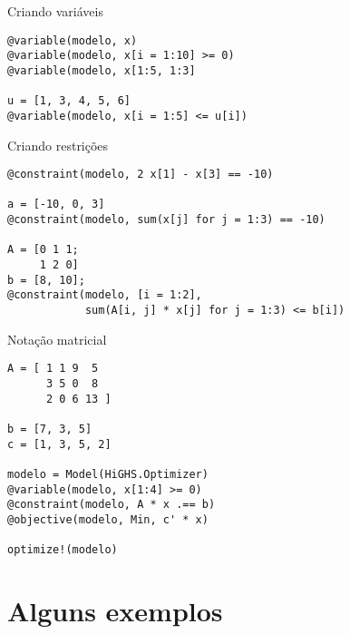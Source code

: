 \documentclass[10pt]{beamer}
\begin{document}
\begin{frame}[fragile]{Criando variáveis}

  \begin{center}
\begin{verbatim}
@variable(modelo, x)
@variable(modelo, x[i = 1:10] >= 0)
@variable(modelo, x[1:5, 1:3]

u = [1, 3, 4, 5, 6]
@variable(modelo, x[i = 1:5] <= u[i])
\end{verbatim}
  \end{center}
  
\end{frame}

\begin{frame}[fragile]{Criando restrições}

  \begin{center}
\begin{verbatim}
@constraint(modelo, 2 x[1] - x[3] == -10)

a = [-10, 0, 3]
@constraint(modelo, sum(x[j] for j = 1:3) == -10)

A = [0 1 1;
     1 2 0]
b = [8, 10];
@constraint(modelo, [i = 1:2],
            sum(A[i, j] * x[j] for j = 1:3) <= b[i])
\end{verbatim}
  \end{center}
  
\end{frame}

\begin{frame}[fragile]{Notação matricial}

\begin{verbatim}
A = [ 1 1 9  5
      3 5 0  8
      2 0 6 13 ]

b = [7, 3, 5]
c = [1, 3, 5, 2]

modelo = Model(HiGHS.Optimizer)
@variable(modelo, x[1:4] >= 0)
@constraint(modelo, A * x .== b)
@objective(modelo, Min, c' * x)

optimize!(modelo)
\end{verbatim}
  
\end{frame}

\section{Alguns exemplos}
\end{document}
